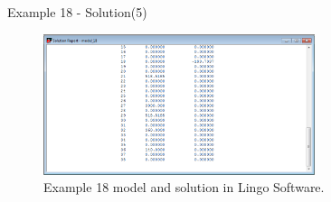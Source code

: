 \begin{frame}{Example 18 - Solution(5)}
\begin{figure}
    \includegraphics[width=300px]{slides/ex18/screenshot_e.png}
    \caption{Example 18 model and solution in Lingo Software.}
\end{figure}
\end{frame}


